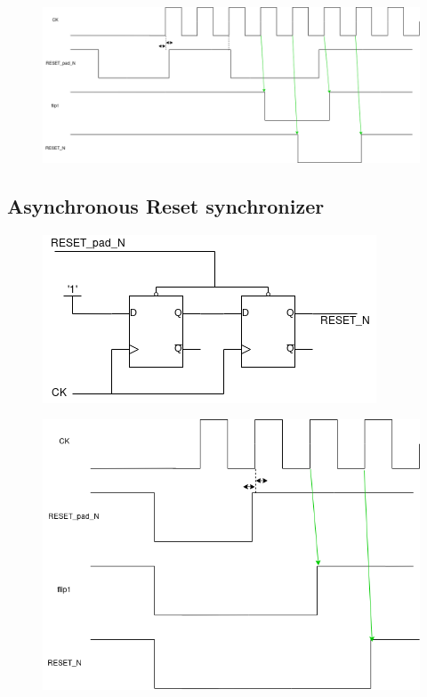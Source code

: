 \documentclass[11pt,a4paper,sans,dvipsnames]{report}
\begin{document}
	\begin{figure}[h!]
		\centering
		\includegraphics[height=0.32\linewidth,width=1.0\linewidth]{images/sync_reset_chrono.png}
		\label{fig:sync_synchronizer_chrono}
	\end{figure}

	\newpage
	\subsection*{Asynchronous Reset synchronizer}
	\begin{figure}[h!]
		\centering
		\includegraphics[width=0.65\linewidth]{images/async_reset_sync.png}
		\label{fig:async_synchronizer}
	\end{figure}

	\begin{figure}[h!]
		\centering
		
		\label{fig:async_synchronizer_code}
	\end{figure}

	\begin{figure}[h!]
		\centering
		\includegraphics[height=0.34\linewidth,width=0.77\linewidth]{images/async_reset_chrono.png}
		\label{fig:async_synchronizer_chrono}
	\end{figure}
\end{document}
